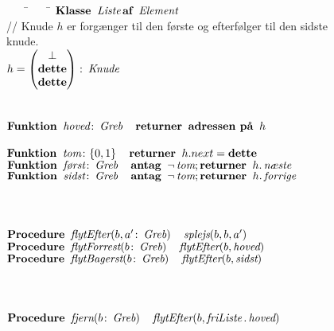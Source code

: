 \begin{figure}
  \small
  \begin{tabbing}
    ~~~~\=~~~~\=\kill
    $\Class \varname{Liste} \of \varname{Element}$\\
    \> \textcolor{callout}{/\!\!/ Knude $h$ er forgænger til den første og efterfølger til den sidste knude.}\\
    \> $h=\begin{pmatrix}\bot\\\this\\\this\end{pmatrix}\colon\varname{Knude} $\\
    \\
    \> \\
    \> $\Function\varname{hoved}\colon\Handle\quad \return \adressof h$
    \qquad {}\\
    \\
    \> $\Function\varname{tom}\colon\{0,1\} \quad\return h.next = \this$\\
    \> $\Function\varname{først}\colon\Handle \quad\assert \neg\varname{tom}; \return h.\varname{næste} $\\
    \> $\Function\varname{sidst}\colon\Handle \quad\assert \neg\varname{tom}; \return h.\varname{forrige} $\\
    \\
    \>\\
    \>\\
    \>$\Procedure \varname{flytEfter}(b,a'\colon\Handle) \quad\varname{splejs}(b,b,a')$\\
    \>$\Procedure \varname{flytForrest}(b\colon\Handle) \quad\varname{flytEfter}(b,\varname{hoved})$\\
    \>$\Procedure \varname{flytBagerst}(b\colon\Handle) \quad\varname{flytEfter}(b,\varname{sidst})$\\
    \\
    \>\\
    \>\\
    \>$\Procedure \varname{fjern}(b\colon\Handle) \quad\varname{flytEfter}(b,\varname{friListe}.\varname{hoved})$\\

\end{tabbing}
\end{figure}
